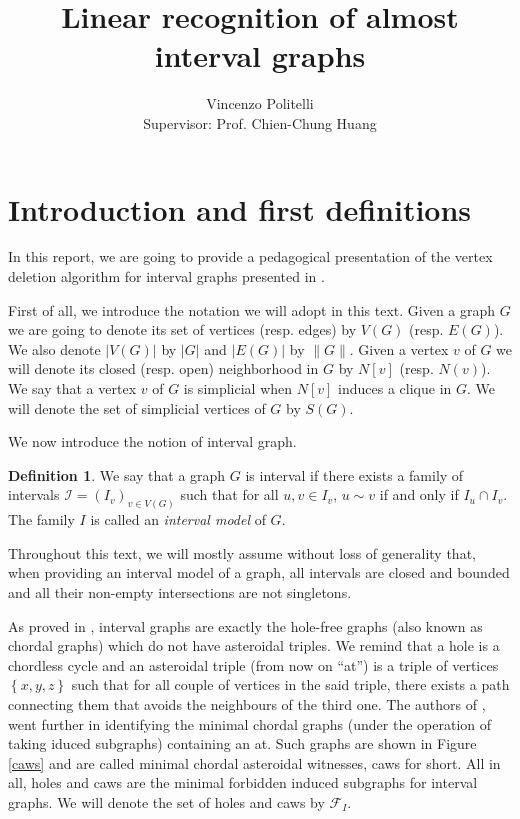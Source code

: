 \documentclass{article}
\title{Linear recognition of almost interval graphs}
\author{Vincenzo Politelli \\ Supervisor: Prof. Chien-Chung Huang}
\date{}
\theoremstyle{definition}
\newtheorem{defn}[thm]{Definition}
\begin{document}
    \maketitle
    
    \section{Introduction and first definitions}
   
    In this report,
    we are going to provide
    a pedagogical presentation
    of the vertex deletion algorithm
    for interval graphs presented in \cite{main}.
    
    First of all, 
    we introduce the notation we will
    adopt in this text.
    Given a graph $G$ we
    are going to denote
    its set of vertices (resp. edges)
    by $V\left(G\right)$
    (resp. $E\left(G\right)$).
    We also denote $\left|V\left(G\right)\right|$ 
    by $\left|G\right|$ and
    $\left|E\left(G\right)\right|$
    by $\|G\|$.
    Given a vertex $v$ of
    $G$ we will denote its
    closed (resp. open)
    neighborhood in $G$ 
    by $N\left[v\right]$ 
    (resp. $N\left(v\right)$).
    We say that a vertex
    $v$ of $G$ is simplicial
    when $N\left[v\right]$ 
    induces a clique in $G$.
    We will denote the set
    of simplicial vertices of $G$ 
    by $S\left(G\right)$.

    We now introduce the 
    notion of interval graph.

    \begin{defn}
        We say that a graph $G$
        is interval if there 
        exists a family of intervals
        $\mathcal{I} = \left(I_{v}\right)_{v \in V\left(G\right)}$
         such that
         for all $u, v \in I_{v}$,
         $u \sim v$ if and only if
         $I_{u} \cap I_{v}$.
         The family $I$ is called
         an \emph{interval model}
         of $G$.
    \end{defn}

    Throughout this text,
    we will mostly assume
    without loss of generality
    that, when providing
    an interval model of a graph,
    all intervals are closed
    and bounded and all their
    non-empty intersections
    are not singletons.

    As proved in \cite{holes-caws},
    interval graphs
    are exactly
    the hole-free graphs
    (also known as chordal graphs)
    which do not have
    asteroidal triples.
    We remind that a hole is a
    chordless cycle and an
    asteroidal triple (from 
    now on ``at'')
    is a triple of vertices
    $\left\{x, y, z\right\}$ 
    such that for all
    couple of vertices in
    the said triple, 
    there exists a path
    connecting them
    that avoids the neighbours
    of the third one.
    The authors of \cite{holes-caws},
    went further in identifying
    the minimal chordal graphs
    (under the operation
    of taking iduced subgraphs)
    containing an at.
    Such graphs are shown in
    Figure \ref{caws} and are called
    minimal chordal asteroidal
    witnesses, caws for short.
    All in all, holes and caws
    are the minimal forbidden
    induced subgraphs for 
    interval graphs.
    We will denote the set of
    holes and caws by $\mathcal{F}_{I}$.
\end{document}
